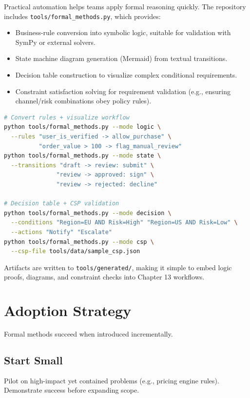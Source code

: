 Practical automation helps teams apply formal reasoning quickly. The repository includes \texttt{tools/formal\_methods.py}, which provides:
\begin{itemize}
    \item Business-rule conversion into symbolic logic, suitable for validation with SymPy or external solvers.
    \item State machine diagram generation (Mermaid) from textual transitions.
    \item Decision table construction to visualize complex conditional requirements.
    \item Constraint satisfaction solving for requirement validation (e.g., ensuring channel/risk combinations obey policy rules).
\end{itemize}

\begin{lstlisting}[language=bash,caption={Using the formal methods automation CLI.}]
# Convert rules + visualize workflow
python tools/formal_methods.py --mode logic \
  --rules "user_is_verified -> allow_purchase" \
          "order_value > 100 -> flag_manual_review"
python tools/formal_methods.py --mode state \
  --transitions "draft -> review: submit" \
               "review -> approved: sign" \
               "review -> rejected: decline"

# Decision table + CSP validation
python tools/formal_methods.py --mode decision \
  --conditions "Region=EU AND Risk=High" "Region=US AND Risk=Low" \
  --actions "Notify" "Escalate"
python tools/formal_methods.py --mode csp \
  --csp-file tools/data/sample_csp.json
\end{lstlisting}

Artifacts are written to \texttt{tools/generated/}, making it simple to embed logic proofs, diagrams, and constraint checks into Chapter 13 workflows.

\section{Adoption Strategy}
\label{sec:adoption}

Formal methods succeed when introduced incrementally.

\subsection{Start Small}
Pilot on high-impact yet contained problems (e.g., pricing engine rules). Demonstrate success before expanding scope.


